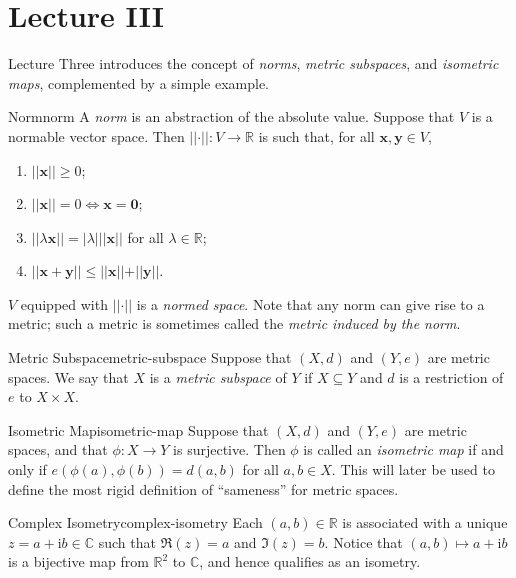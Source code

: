\documentclass{article}
\renewcommand*\vec{\mathbf}
\numberwithin{equation}{section}
\numberwithin{enumi}{section}
\begin{document}
\section{Lecture III}

Lecture Three introduces the concept of \emph{norms}, \emph{metric subspaces},
and \emph{isometric maps}, complemented by a simple example.
\begin{definition}{Norm}{norm}
    A \emph{norm} is an abstraction of the absolute value. Suppose that $ V $ is
    a normable vector space. Then $ \vert\vert\cdot\vert\vert \colon V \to
    \mathbb{R} $ is such that, for all $ \vec{x}, \vec{y} \in V $,
    \begin{enumerate}
        \item $ \vert\vert \vec{x} \vert\vert \geq 0 $;
        \item $ \vert\vert \vec{x} \vert\vert = 0 \iff \vec{x} = \vec{0} $;
        \item $ \vert\vert \lambda \vec{x} \vert\vert = \vert \lambda \vert
            \vert\vert \vec{x} \vert\vert $ for all $ \lambda \in \mathbb{R} $;
        \item $ \vert\vert \vec{x} + \vec{y} \vert\vert \leq \vert\vert \vec{x}
            \vert\vert + \vert\vert \vec{y} \vert\vert $.
    \end{enumerate}
    $ V $ equipped with $ \vert\vert \cdot \vert\vert $ is a \emph{normed
    space}. Note that any norm can give rise to a metric; such a metric is
    sometimes called the \emph{metric induced by the norm}.
\end{definition}
\begin{definition}{Metric Subspace}{metric-subspace}
    Suppose that $ (X, d) $ and $ (Y, e) $ are metric spaces. We say that $ X $
    is a \emph{metric subspace} of $ Y $ if $ X \subseteq Y $ and $ d $ is a
    restriction of $ e $ to $ X \times X $.
\end{definition}
\begin{definition}{Isometric Map}{isometric-map}
    Suppose that $ (X, d) $ and $ (Y, e) $ are metric spaces, and that $ \phi
    \colon X \to Y $ is surjective. Then $ \phi $ is called an \emph{isometric
    map} if and only if $ e(\phi(a), \phi(b)) = d(a, b) $ for all $ a, b \in X
    $. This will later be used to define the most rigid definition of
    ``sameness'' for metric spaces.
\end{definition}
\begin{example}{Complex Isometry}{complex-isometry}
    Each $ (a, b) \in \mathbb{R} $ is associated with a unique $ z = a +
    \mathrm{i}b \in \mathbb{C} $ such that $ \Re(z) = a $ and $ \Im(z) = b $.
    Notice that $ (a, b) \mapsto a + \mathrm{i}b $ is a bijective map from $
    \mathbb{R}^2 $ to $ \mathbb{C} $, and hence qualifies as an isometry.
\end{example}
\end{document}

